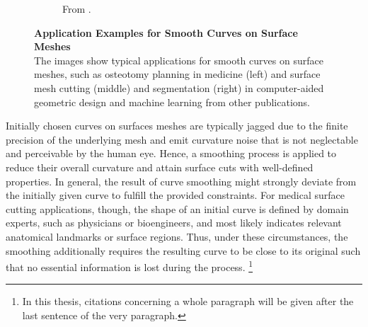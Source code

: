 \documentclass{stdlocal}
\begin{document}
\begin{figure}[b]
\begin{subfigure}[b]{0.32\linewidth}
    \caption{From \textcite{ji2006}.}
    \label{fig:introduction-examples-ji2006}
  \end{subfigure}
  \caption[Application Examples for Smooth Curves on Surface Meshes]{%
    \textbf{Application Examples for Smooth Curves on Surface Meshes}\\
    The images show typical applications for smooth curves on surface meshes, such as osteotomy planning in medicine (left) and surface mesh cutting (middle) and segmentation (right) in computer-aided geometric design and machine learning from other publications.
  }
  \label{fig:introduction-examples}
\end{figure}

Initially chosen curves on surfaces meshes are typically jagged due to the finite precision of the underlying mesh and emit curvature noise that is not neglectable and perceivable by the human eye.
Hence, a smoothing process is applied to reduce their overall curvature and attain surface cuts with well-defined properties.
In general, the result of curve smoothing might strongly deviate from the initially given curve to fulfill the provided constraints.
For medical surface cutting applications, though, the shape of an initial curve is defined by domain experts, such as physicians or bioengineers, and most likely indicates relevant anatomical landmarks or surface regions.
Thus, under these circumstances, the smoothing additionally requires the resulting curve to be close to its original such that no essential information is lost during the process.
\autocite{lawonn2014}\footnote{In this thesis, citations concerning a whole paragraph will be given after the last sentence of the very paragraph.}

\end{document}
